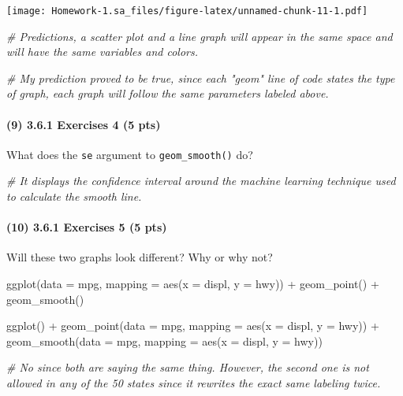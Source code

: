 \documentclass[
]{article}
\newenvironment{Shaded}{\begin{snugshade}}{\end{snugshade}}
\newcommand{\AttributeTok}[1]{\textcolor[rgb]{0.77,0.63,0.00}{#1}}
\newcommand{\CommentTok}[1]{\textcolor[rgb]{0.56,0.35,0.01}{\textit{#1}}}
\newcommand{\FunctionTok}[1]{\textcolor[rgb]{0.00,0.00,0.00}{#1}}
\newcommand{\NormalTok}[1]{#1}
\newcommand{\SpecialCharTok}[1]{\textcolor[rgb]{0.00,0.00,0.00}{#1}}
\begin{document}
\texttt{[image: Homework-1.sa\_files/figure-latex/unnamed-chunk-11-1.pdf]}

\begin{Shaded}
\begin{Highlighting}[]
\CommentTok{\# Predictions, a scatter plot and a line graph will appear in the same space and will have the same variables and colors. }

\CommentTok{\# My prediction proved to be true, since each "geom" line of code states the type of graph, each graph will follow the same parameters labeled above.}
\end{Highlighting}
\end{Shaded}

\hypertarget{exercises-4-5-pts}{%
\paragraph{(9) 3.6.1 Exercises 4 (5 pts)}\label{exercises-4-5-pts}}

What does the \texttt{se} argument to \texttt{geom\_smooth()} do?

\begin{Shaded}
\begin{Highlighting}[]
\CommentTok{\# It displays the confidence interval around the machine learning technique used to calculate the smooth line. }
\end{Highlighting}
\end{Shaded}

\hypertarget{exercises-5-5-pts}{%
\paragraph{(10) 3.6.1 Exercises 5 (5 pts)}\label{exercises-5-5-pts}}

Will these two graphs look different? Why or why not?

\begin{Shaded}
\begin{Highlighting}[]
\FunctionTok{ggplot}\NormalTok{(}\AttributeTok{data =}\NormalTok{ mpg, }\AttributeTok{mapping =} \FunctionTok{aes}\NormalTok{(}\AttributeTok{x =}\NormalTok{ displ, }\AttributeTok{y =}\NormalTok{ hwy)) }\SpecialCharTok{+} 
  \FunctionTok{geom\_point}\NormalTok{() }\SpecialCharTok{+} 
  \FunctionTok{geom\_smooth}\NormalTok{()}

\FunctionTok{ggplot}\NormalTok{() }\SpecialCharTok{+} 
  \FunctionTok{geom\_point}\NormalTok{(}\AttributeTok{data =}\NormalTok{ mpg, }\AttributeTok{mapping =} \FunctionTok{aes}\NormalTok{(}\AttributeTok{x =}\NormalTok{ displ, }\AttributeTok{y =}\NormalTok{ hwy)) }\SpecialCharTok{+} 
  \FunctionTok{geom\_smooth}\NormalTok{(}\AttributeTok{data =}\NormalTok{ mpg, }\AttributeTok{mapping =} \FunctionTok{aes}\NormalTok{(}\AttributeTok{x =}\NormalTok{ displ, }\AttributeTok{y =}\NormalTok{ hwy))}

\CommentTok{\# No since both are saying the same thing. However, the second one is not allowed in any of the 50 states since it rewrites the exact same labeling twice.}
\end{Highlighting}
\end{Shaded}
\end{document}
